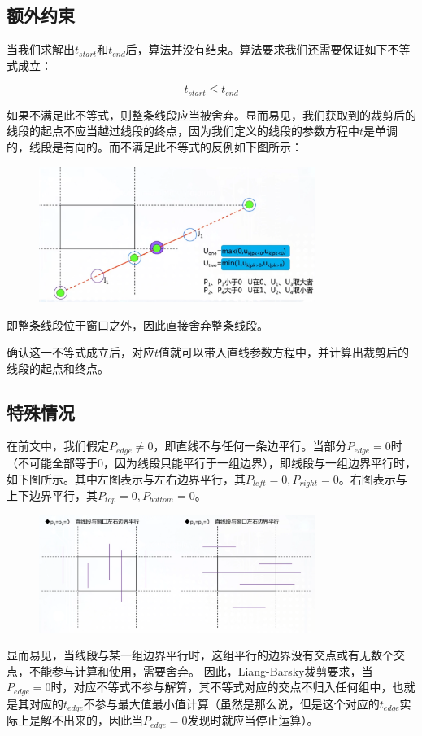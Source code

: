 \subsection{额外约束}

当我们求解出$t_{start}$和$t_{end}$后，算法并没有结束。算法要求我们还需要保证如下不等式成立：

\begin{equation}
t_{start} \leq t_{end}
\end{equation}

如果不满足此不等式，则整条线段应当被舍弃。显而易见，我们获取到的裁剪后的线段的起点不应当越过线段的终点，因为我们定义的线段的参数方程中$t$是单调的，线段是有向的。而不满足此不等式的反例如下图所示：

\begin{figure}[H]
\centering
\includegraphics[width=0.8\textwidth,keepaspectratio]{imgs/lb-clip-invalid.png}
\end{figure}

即整条线段位于窗口之外，因此直接舍弃整条线段。

确认这一不等式成立后，对应$t$值就可以带入直线参数方程中，并计算出裁剪后的线段的起点和终点。

\subsection{特殊情况}

在前文中，我们假定$P_{edge} \neq 0$，即直线不与任何一条边平行。当部分$P_{edge}=0$时（不可能全部等于0，因为线段只能平行于一组边界），即线段与一组边界平行时，如下图所示。其中左图表示与左右边界平行，其$P_{left}=0,P_{right}=0$。右图表示与上下边界平行，其$P_{top}=0,P_{bottom}=0$。

\begin{figure}[H]
\centering
\includegraphics[width=0.8\textwidth,keepaspectratio]{imgs/lb-clip-special.png}
\end{figure}

显而易见，当线段与某一组边界平行时，这组平行的边界没有交点或有无数个交点，不能参与计算和使用，需要舍弃。
因此，Liang-Barsky裁剪要求，当$P_{edge}=0$时，对应不等式不参与解算，其不等式对应的交点不归入任何组中，也就是其对应的$t_{edge}$不参与最大值最小值计算（虽然是那么说，但是这个对应的$t_{edge}$实际上是解不出来的，因此当$P_{edge}=0$发现时就应当停止运算）。



